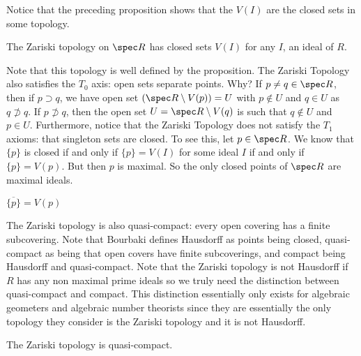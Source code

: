 Notice that the preceding proposition shows that the $V(I)$ are the closed sets in some topology.

\begin{dfn}
The Zariski topology on $\spec R$ has closed sets $V(I)$ for any $I$, an ideal of $R$.
\end{dfn}

Note that this topology is well defined by the proposition. The Zariski Topology also satisfies the $T_0$ axis: open sets separate points. Why? If $p \neq q \in \spec R$, then if $p \supset q$, we have open set $(\spec R \setminus V(p))=U$ with $p \notin U$ and $q \in U$ as $q \not\supset q$. If $p\not\supset q$, then the open set $U=\spec R \setminus V(q)$ is such that $q \notin U$ and $p \in U$. Furthermore, notice that the Zariski Topology does not satisfy the $T_1$ axioms: that singleton sets are closed. To see this, let $p \in \spec R$. We know that $\{p\}$ is closed if and only if $\{p\}=V(I)$ for some ideal $I$ if and only if $\{p\}=V(p)$. But then $p$ is maximal. So the only closed points of $\spec R$ are maximal ideals. 

\begin{cor}
$\overline{\{p\}}=V(p)$
\end{cor}

The Zariski topology is also quasi-compact: every open covering has a finite subcovering. Note that Bourbaki defines Hausdorff as points being closed, quasi-compact as being that open covers have finite subcoverings, and compact being Hausdorff and quasi-compact. Note that the Zariski topology is not Hausdorff if $R$ has any non maximal prime ideals so we truly need the distinction between quasi-compact and compact. This distinction essentially only exists for algebraic geometers and algebraic number theorists since they are essentially the only topology they consider is the Zariski topology and it is not Hausdorff. 

\begin{prop}
The Zariski topology is quasi-compact.
\end{prop}

